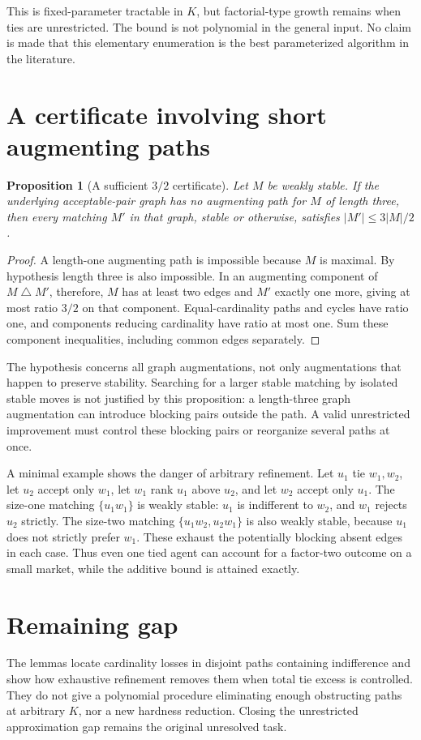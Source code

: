 \documentclass[11pt,a4paper]{article}
\newtheorem{proposition}[theorem]{Proposition}
\theoremstyle{remark}
\begin{document}
This is fixed-parameter tractable in $K$, but factorial-type growth remains when ties are unrestricted. The bound is not polynomial in the general input. No claim is made that this elementary enumeration is the best parameterized algorithm in the literature.

\section{A certificate involving short augmenting paths}
\begin{proposition}[A sufficient $3/2$ certificate]
Let $M$ be weakly stable. If the underlying acceptable-pair graph has no augmenting path for $M$ of length three, then every matching $M'$ in that graph, stable or otherwise, satisfies $|M'|\le3|M|/2$.
\end{proposition}
\begin{proof}
A length-one augmenting path is impossible because $M$ is maximal. By hypothesis length three is also impossible. In an augmenting component of $M\mathbin\triangle M'$, therefore, $M$ has at least two edges and $M'$ exactly one more, giving at most ratio $3/2$ on that component. Equal-cardinality paths and cycles have ratio one, and components reducing cardinality have ratio at most one. Sum these component inequalities, including common edges separately.
\end{proof}

The hypothesis concerns all graph augmentations, not only augmentations that happen to preserve stability. Searching for a larger stable matching by isolated stable moves is not justified by this proposition: a length-three graph augmentation can introduce blocking pairs outside the path. A valid unrestricted improvement must control these blocking pairs or reorganize several paths at once.

A minimal example shows the danger of arbitrary refinement. Let $u_1$ tie $w_1,w_2$, let $u_2$ accept only $w_1$, let $w_1$ rank $u_1$ above $u_2$, and let $w_2$ accept only $u_1$. The size-one matching $\{u_1w_1\}$ is weakly stable: $u_1$ is indifferent to $w_2$, and $w_1$ rejects $u_2$ strictly. The size-two matching $\{u_1w_2,u_2w_1\}$ is also weakly stable, because $u_1$ does not strictly prefer $w_1$. These exhaust the potentially blocking absent edges in each case. Thus even one tied agent can account for a factor-two outcome on a small market, while the additive bound is attained exactly.

\section{Remaining gap}
The lemmas locate cardinality losses in disjoint paths containing indifference and show how exhaustive refinement removes them when total tie excess is controlled. They do not give a polynomial procedure eliminating enough obstructing paths at arbitrary $K$, nor a new hardness reduction. Closing the unrestricted approximation gap remains the original unresolved task.
\end{document}
